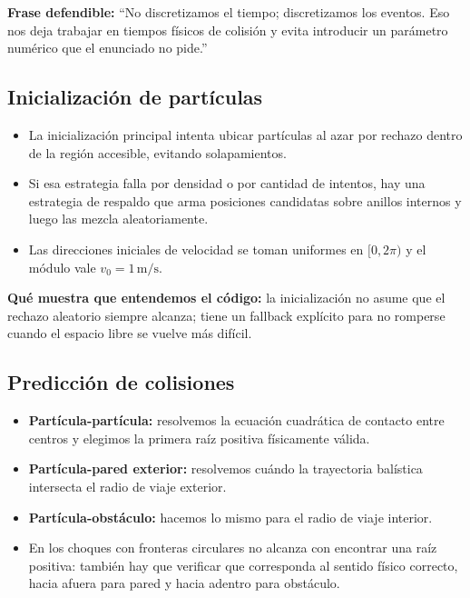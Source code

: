 \documentclass[11pt]{article}
\begin{document}
\textbf{Frase defendible:} ``No discretizamos el tiempo; discretizamos los eventos. Eso nos deja trabajar en tiempos f\'isicos de colisi\'on y evita introducir un par\'ametro num\'erico que el enunciado no pide.''

\subsection{Inicializaci\'on de part\'iculas}

\begin{itemize}
  \item La inicializaci\'on principal intenta ubicar part\'iculas al azar por rechazo dentro de la regi\'on accesible, evitando solapamientos.
  \item Si esa estrategia falla por densidad o por cantidad de intentos, hay una estrategia de respaldo que arma posiciones candidatas sobre anillos internos y luego las mezcla aleatoriamente.
  \item Las direcciones iniciales de velocidad se toman uniformes en $[0,2\pi)$ y el m\'odulo vale $v_0=1\,\mathrm{m/s}$.
\end{itemize}

\textbf{Qu\'e muestra que entendemos el c\'odigo:} la inicializaci\'on no asume que el rechazo aleatorio siempre alcanza; tiene un fallback expl\'icito para no romperse cuando el espacio libre se vuelve m\'as dif\'icil.

\subsection{Predicci\'on de colisiones}

\begin{itemize}
  \item \textbf{Part\'icula-part\'icula:} resolvemos la ecuaci\'on cuadr\'atica de contacto entre centros y elegimos la primera ra\'iz positiva f\'isicamente v\'alida.
  \item \textbf{Part\'icula-pared exterior:} resolvemos cu\'ando la trayectoria bal\'istica intersecta el radio de viaje exterior.
  \item \textbf{Part\'icula-obst\'aculo:} hacemos lo mismo para el radio de viaje interior.
  \item En los choques con fronteras circulares no alcanza con encontrar una ra\'iz positiva: tambi\'en hay que verificar que corresponda al sentido f\'isico correcto, hacia afuera para pared y hacia adentro para obst\'aculo.
\end{itemize}
\end{document}
